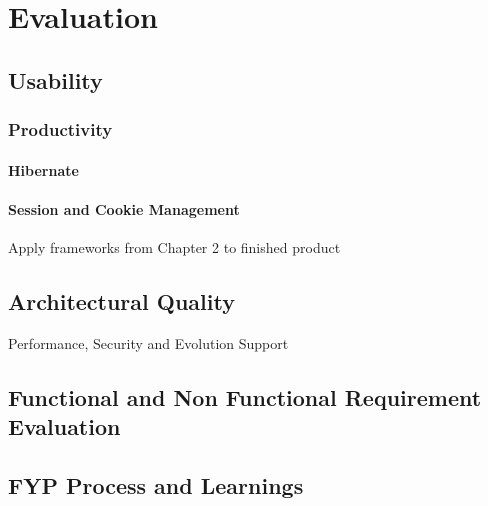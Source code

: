 \chapter{Evaluation}
\label{evaluation}

\section{Usability}

\subsection{Productivity}

\subsubsection{Hibernate}

\subsubsection{Session and Cookie Management}
Apply frameworks from Chapter 2 to finished product

\section{Architectural Quality}

Performance, Security and Evolution Support

\section{Functional and Non Functional Requirement Evaluation}

\section{FYP Process and Learnings}


